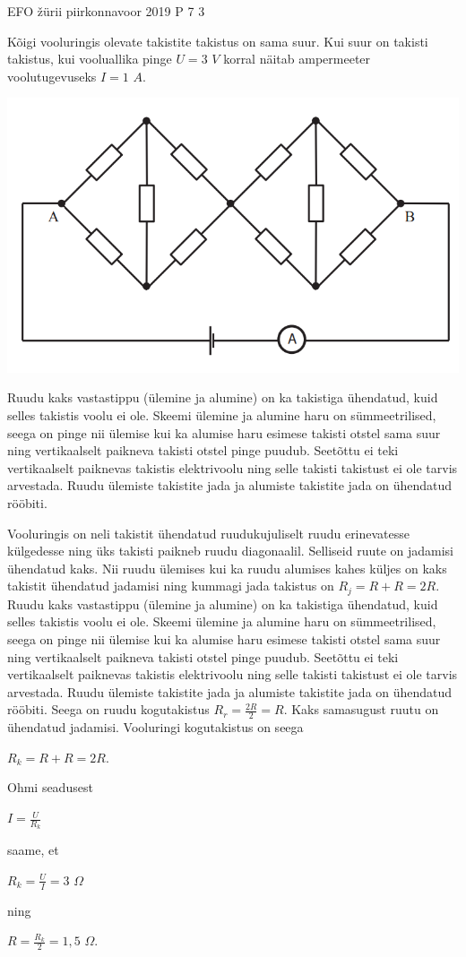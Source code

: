 {EFO žürii} %
{piirkonnavoor} %
{2019} %
{P 7} %
{3} %
{

\ifStatement
Kõigi vooluringis olevate takistite takistus on sama suur. Kui suur on takisti takistus, kui vooluallika pinge $U = 3$ $V$ korral näitab ampermeeter voolutugevuseks $I = 1$ $A$.
\begin{center}
	\includegraphics[width=0.5\linewidth]{2019-v2p-07-yl.png}
\end{center}
\fi

\ifHint
Ruudu kaks vastastippu (ülemine ja alumine) on ka takistiga ühendatud, kuid selles takistis voolu ei ole. Skeemi ülemine ja alumine haru on sümmeetrilised, seega on pinge nii ülemise kui ka alumise haru esimese takisti otstel sama suur ning vertikaalselt paikneva takisti otstel pinge puudub. Seetõttu ei teki vertikaalselt paiknevas takistis elektrivoolu ning selle takisti takistust ei ole tarvis arvestada. Ruudu ülemiste takistite jada ja alumiste takistite jada on ühendatud rööbiti.
\fi


\ifSolution
Vooluringis on neli takistit ühendatud ruudukujuliselt ruudu erinevatesse külgedesse ning üks takisti paikneb ruudu diagonaalil. Selliseid ruute on jadamisi ühendatud kaks. Nii ruudu ülemises kui ka ruudu alumises kahes küljes on kaks takistit ühendatud jadamisi ning kummagi jada takistus on $R_j = R + R = 2R$. Ruudu kaks vastastippu (ülemine ja alumine) on ka takistiga ühendatud, kuid selles takistis voolu ei ole. Skeemi ülemine ja alumine haru on sümmeetrilised, seega on pinge nii ülemise kui ka alumise haru esimese takisti otstel sama suur ning vertikaalselt paikneva takisti otstel pinge puudub. Seetõttu ei teki vertikaalselt paiknevas takistis elektrivoolu ning selle takisti takistust ei ole tarvis arvestada. Ruudu ülemiste takistite jada ja alumiste takistite jada on ühendatud rööbiti. Seega on ruudu kogutakistus $R_r =\frac{2R}{2}= R$. Kaks samasugust ruutu on ühendatud jadamisi. Vooluringi kogutakistus on seega
\begin{center}
$R_k = R + R = 2R$.
\end{center}
Ohmi seadusest
\begin{center}
$I = \frac{U}{R_k}$ 
\end{center}
saame, et
\begin{center}
$R_k = \frac{U}{I} = 3$ $\Omega$ 
\end{center}
ning
\begin{center}
$R = \frac{R_k}{2} = 1,5$ $\Omega$.
\end{center}
\fi
}